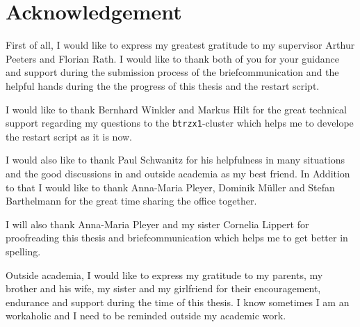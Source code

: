 \chapter*{Acknowledgement}
\label{chap:acknowledgement}

First of all, I would like to express my greatest gratitude to my supervisor Arthur Peeters and Florian Rath. I would like to thank both of you for your guidance and support during the submission process of the briefcommunication and the helpful hands during the the progress of this thesis and the restart script. \bigskip

I would like to thank Bernhard Winkler and Markus Hilt for the great technical support regarding my questions to the \texttt{btrzx1}-cluster which helps me to develope the restart script as it is now. \bigskip

I would also like to thank Paul Schwanitz for his helpfulness in many situations and the good discussions in and outside academia as my best friend. In Addition to that I would like to thank Anna-Maria Pleyer, Dominik Müller and Stefan Barthelmann for the great time sharing the office together. \bigskip

I will also thank Anna-Maria Pleyer and my sister Cornelia Lippert for proofreading this thesis and briefcommunication which helps me to get better in spelling. \bigskip

Outside academia, I would like to express my gratitude to my parents, my brother and his wife, my sister and my girlfriend for their encouragement, endurance and support during the time of this thesis. I know sometimes I am an workaholic and I need to be reminded outside my academic work.